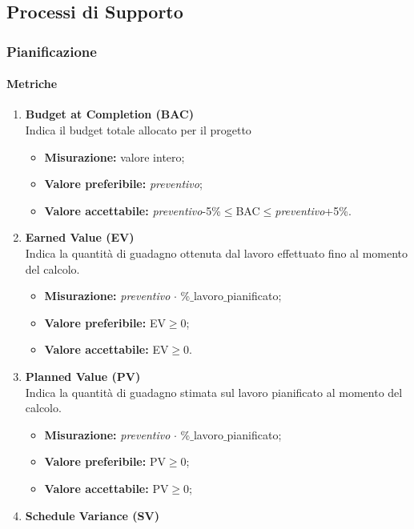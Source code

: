 \subsection{Processi di Supporto}
	\subsubsection{Pianificazione}
		\paragraph{Metriche} 
		\begin{enumerate}
		\item[]
			\textbf{Budget at Completion (BAC)}\\
			Indica il budget totale allocato per il progetto
			\begin{itemize}
				\item \textbf{Misurazione:} valore intero;
				\item \textbf{Valore preferibile:} \textit{preventivo};
				\item \textbf{Valore accettabile:} \textit{preventivo}-5\%$\leq$BAC$\leq$\textit{preventivo}+5\%.
			\end{itemize}
		\item[]
			\textbf{Earned Value (EV)}\\
			Indica la quantità di guadagno ottenuta dal lavoro effettuato fino al momento del calcolo.
			\begin{itemize}
				\item \textbf{Misurazione:} \textit{preventivo} $\cdot$ \%$\_$lavoro$\_$pianificato;
				\item \textbf{Valore preferibile:} EV$\geq$0;
				\item \textbf{Valore accettabile:} EV$\geq$0.
			\end{itemize}
		\item[]
			\textbf{Planned Value (PV)}\\
			Indica la quantità di guadagno stimata sul lavoro pianificato al momento del calcolo.
			\begin{itemize}
				\item \textbf{Misurazione:} \textit{preventivo} $\cdot$ \%$\_$lavoro$\_$pianificato;
				\item \textbf{Valore preferibile:} PV$\geq$0;
				\item \textbf{Valore accettabile:} PV$\geq$0;
			\end{itemize}
		\item[]
			\textbf{Schedule Variance (SV)}\\

\end{enumerate}
